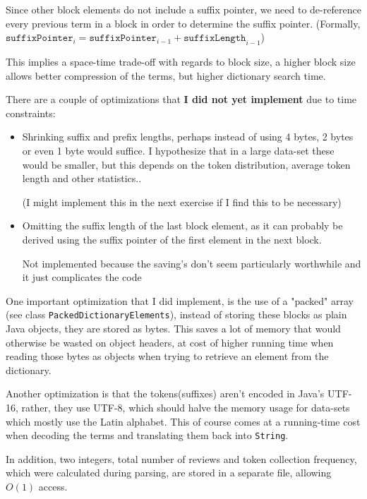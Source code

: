\documentclass[11pt]{article}
\begin{document}
Since other block elements do not include a suffix pointer, we need to de-reference every previous term in a block in order to determine the suffix
pointer. (Formally, $\texttt{suffixPointer}_i = \texttt{suffixPointer}_{i-1} + \texttt{suffixLength}_{i-1}$)

This implies a space-time trade-off with regards to block size, a higher block size allows better compression of the terms, but higher dictionary
search time.


There are a couple of optimizations that \textbf{I did not yet implement} due to time constraints:

\begin{itemize}

\item Shrinking suffix and prefix lengths, perhaps instead of using 4 bytes, 2 bytes or even 1 byte would suffice. I hypothesize that in a 
  large data-set these would be smaller, but this depends on the token distribution, average token length and other statistics..
  
  (I might implement this in the next exercise if I find this to be necessary)
  
\item Omitting the suffix length of the last block element, as it can probably be derived using the suffix pointer of the first element in the next block.
  
  Not implemented because the saving's don't seem particularly worthwhile and it just complicates the code
  
\end{itemize}


One important optimization that I did implement, is the use of a "packed" array (see class \verb+PackedDictionaryElements+), instead of
storing these blocks as plain Java objects, they are stored as bytes. This saves a lot of memory that would otherwise be wasted on object headers, at
cost of higher running time when reading those bytes as objects when trying to retrieve an element from the dictionary.

Another optimization is that the tokens(suffixes) aren't encoded in Java's UTF-16, rather, they use UTF-8, which should halve the memory
usage for data-sets which mostly use the Latin alphabet. This of course comes at a running-time cost when decoding the terms and translating them back into \verb+String+.

In addition, two integers, total number of reviews and token collection frequency, which were calculated during parsing, are stored in a separate file,
allowing $O(1)$ access.
\end{document}
